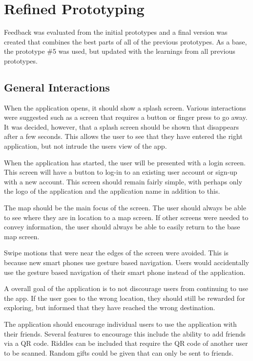 \documentclass[10pt,twocolumn]{article} %
\begin{document}
\section*{Refined Prototyping}

Feedback was evaluated from the initial prototypes and a final version was created that combines the best parts of all of the previous prototypes.
As a base, the prototype \#5 was used, but updated with the learnings from all previous prototypes. 

\subsection*{General Interactions} 
When the application opens, it should show a splash screen. Various interactions were suggested such as a screen that requires a button or finger press to go away. It was decided, however, that a splash screen should be shown that disappears after a few seconds. This allows the user to see that they have entered the right application, but not intrude the users view of the app.

When the application has started, the user will be presented with a login screen. This screen will have a button to log-in to an existing user account or sign-up with a new account. This screen should remain fairly simple, with perhaps only the logo of the application and the application name in addition to this.

The map should be the main focus of the screen. The user should always be able to see where they are in location to a map screen. If other screens were needed to convey information, the user should always be able to easily return to the base map screen.

Swipe motions that were near the edges of the screen were avoided. This is because new smart phones use gesture based navigation. Users would accidentally use the gesture based navigation of their smart phone instead of the application.

A overall goal of the application is to not discourage users from continuing to use the app. If the user goes to the wrong location, they should still be rewarded for exploring, but informed that they have reached the wrong destination.

The application should encourage individual users to use the application with their friends. Several features to encourage this include the ability to add friends via a QR code. Riddles can be included that require the QR code of another user to be scanned. Random gifts could be given that can only be sent to friends.
\end{document}
